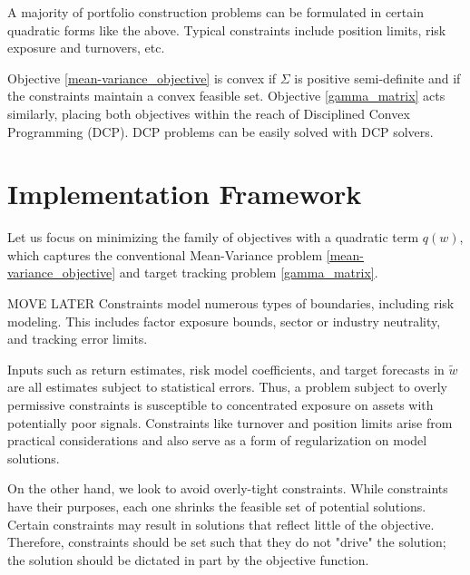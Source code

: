\documentclass[11pt, letterpaper]{article}
\begin{document}
A majority of portfolio construction problems can be formulated in certain quadratic forms like the above. Typical constraints
include position limits, risk exposure and turnovers, etc.

Objective \eqref{mean-variance_objective} is convex if $\Sigma$ is positive semi-definite and if the constraints
maintain a convex feasible set. Objective \eqref{gamma_matrix} acts similarly, placing both objectives within the reach of
Disciplined Convex Programming (DCP). DCP problems can be easily solved with DCP solvers.



\section{Implementation Framework}

Let us focus on minimizing the family of objectives with a quadratic term $q(w)$, which captures the conventional Mean-Variance
problem \eqref{mean-variance_objective} and target tracking problem \eqref{gamma_matrix}.

MOVE LATER
Constraints model numerous types of boundaries, including risk modeling. This includes factor exposure bounds,
sector or industry neutrality, and tracking error limits.

Inputs such as return estimates, risk model coefficients, and target forecasts in $\tilde{w}$ are all estimates subject to
statistical errors. Thus, a problem subject to overly permissive constraints is susceptible to concentrated exposure on assets
with potentially poor signals. Constraints like turnover and position limits arise from practical considerations and also serve as a
form of regularization on model solutions.

On the other hand, we look to avoid overly-tight constraints. While constraints have their purposes, each one shrinks the feasible set of
potential solutions. Certain constraints may result in solutions that reflect little of the objective. Therefore, constraints should be set
such that they do not "drive" the solution; the solution should be dictated in part by the objective function.
\end{document}
